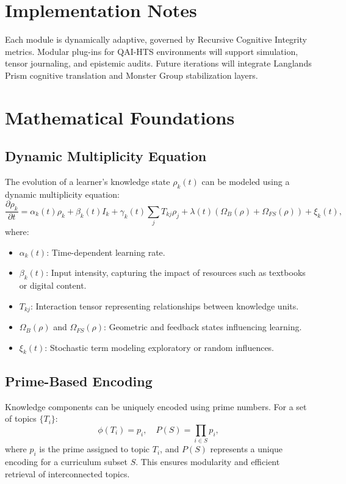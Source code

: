 \documentclass[11pt]{article}
\theoremstyle{plain}
\theoremstyle{definition}
\begin{document}
\section*{Implementation Notes}
Each module is dynamically adaptive, governed by Recursive Cognitive Integrity metrics. Modular plug-ins for QAI-HTS environments will support simulation, tensor journaling, and epistemic audits. Future iterations will integrate Langlands Prism cognitive translation and Monster Group stabilization layers.
\section{Mathematical Foundations}

\subsection{Dynamic Multiplicity Equation}
The evolution of a learner's knowledge state \( \rho_k(t) \) can be modeled using a dynamic multiplicity equation:
\begin{equation}
\frac{\partial \rho_k}{\partial t} = \alpha_k(t) \rho_k + \beta_k(t) I_k + \gamma_k(t) \sum_j T_{kj} \rho_j + \lambda(t)(\Omega_B(\rho) + \Omega_{FS}(\rho)) + \xi_k(t),
\label{eq:dynamic}
\end{equation}
where:
\begin{itemize}
    \item \( \alpha_k(t) \): Time-dependent learning rate.
    \item \( \beta_k(t) \): Input intensity, capturing the impact of resources such as textbooks or digital content.
    \item \( T_{kj} \): Interaction tensor representing relationships between knowledge units.
    \item \( \Omega_B(\rho) \) and \( \Omega_{FS}(\rho) \): Geometric and feedback states influencing learning.
    \item \( \xi_k(t) \): Stochastic term modeling exploratory or random influences.
\end{itemize}

\subsection{Prime-Based Encoding}
Knowledge components can be uniquely encoded using prime numbers. For a set of topics \( \{T_i\} \):
\begin{equation}
\phi(T_i) = p_i, \quad P(S) = \prod_{i \in S} p_i,
\label{eq:prime_encoding}
\end{equation}
where \( p_i \) is the prime assigned to topic \( T_i \), and \( P(S) \) represents a unique encoding for a curriculum subset \( S \). This ensures modularity and efficient retrieval of interconnected topics.
\end{document}
